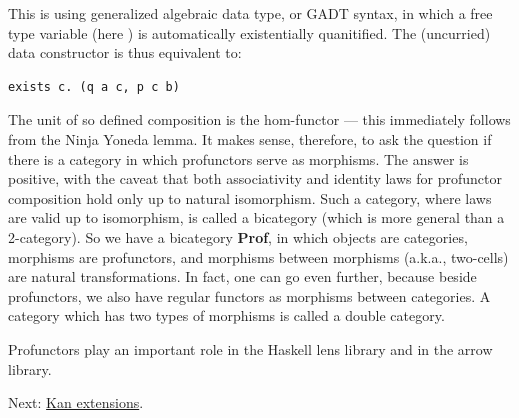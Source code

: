 This is using generalized algebraic data type, or GADT syntax, in which
a free type variable (here ) is automatically existentially
quanitified. The (uncurried) data constructor  is
thus equivalent to:

\begin{verbatim}
exists c. (q a c, p c b)
\end{verbatim}

The unit of so defined composition is the hom-functor --- this
immediately follows from the Ninja Yoneda lemma. It makes sense,
therefore, to ask the question if there is a category in which
profunctors serve as morphisms. The answer is positive, with the caveat
that both associativity and identity laws for profunctor composition
hold only up to natural isomorphism. Such a category, where laws are
valid up to isomorphism, is called a bicategory (which is more general
than a 2-category). So we have a bicategory \textbf{Prof}, in which
objects are categories, morphisms are profunctors, and morphisms between
morphisms (a.k.a., two-cells) are natural transformations. In fact, one
can go even further, because beside profunctors, we also have regular
functors as morphisms between categories. A category which has two types
of morphisms is called a double category.

Profunctors play an important role in the Haskell lens library and in
the arrow library.

Next: \href{https://bartoszmilewski.com/2017/04/17/kan-extensions/}{Kan
extensions}.
